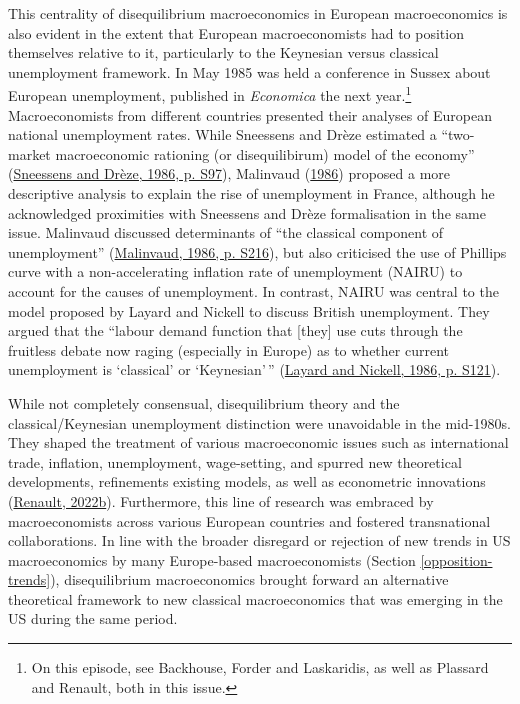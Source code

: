 \documentclass[
  12pt,
  onecolumn]{article}
\begin{document}
This centrality of disequilibrium macroeconomics in European
macroeconomics is also evident in the extent that European
macroeconomists had to position themselves relative to it, particularly
to the Keynesian versus classical unemployment framework. In May 1985
was held a conference in Sussex about European unemployment, published
in \emph{Economica} the next year.\footnote{On this episode, see
  Backhouse, Forder and Laskaridis, as well as Plassard and Renault,
  both in this issue.} Macroeconomists from different countries
presented their analyses of European national unemployment rates. While
Sneessens and Drèze estimated a ``two-market macroeconomic rationing (or
disequilibirum) model of the economy''
(\protect\hyperlink{ref-sneessens1986}{Sneessens and Drèze, 1986, p.
S97}), Malinvaud (\protect\hyperlink{ref-malinvaud1986}{1986}) proposed
a more descriptive analysis to explain the rise of unemployment in
France, although he acknowledged proximities with Sneessens and Drèze
formalisation in the same issue. Malinvaud discussed determinants of
``the classical component of unemployment''
(\protect\hyperlink{ref-malinvaud1986}{Malinvaud, 1986, p. S216}), but
also criticised the use of Phillips curve with a non-accelerating
inflation rate of unemployment (NAIRU) to account for the causes of
unemployment. In contrast, NAIRU was central to the model proposed by
Layard and Nickell to discuss British unemployment. They argued that the
``labour demand function that {[}they{]} use cuts through the fruitless
debate now raging (especially in Europe) as to whether current
unemployment is `classical' or `Keynesian'\,''
(\protect\hyperlink{ref-layard1986}{Layard and Nickell, 1986, p. S121}).

While not completely consensual, disequilibrium theory and the
classical/Keynesian unemployment distinction were unavoidable in the
mid-1980s. They shaped the treatment of various macroeconomic issues
such as international trade, inflation, unemployment, wage-setting, and
spurred new theoretical developments, refinements existing models, as
well as econometric innovations
(\protect\hyperlink{ref-renault2019}{Renault, 2022b}). Furthermore, this
line of research was embraced by macroeconomists across various European
countries and fostered transnational collaborations. In line with the
broader disregard or rejection of new trends in US macroeconomics by
many Europe-based macroeconomists (Section \ref{opposition-trends}),
disequilibrium macroeconomics brought forward an alternative theoretical
framework to new classical macroeconomics that was emerging in the US
during the same period.
\end{document}
